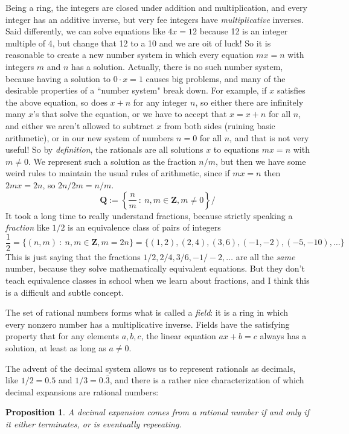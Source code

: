 \documentclass[11pt]{amsart}
\newcommand*{\Z}{\ensuremath{\mathbf{Z}}}
\newcommand*{\Q}{\ensuremath{\mathbf{Q}}}
\theoremstyle{plain}
\newtheorem{proposition}[theorem]{Proposition}
\theoremstyle{definition}
\theoremstyle{remark}
\numberwithin{theorem}{section}
\numberwithin{equation}{section}
\begin{document}
Being a ring, the integers are closed under addition and multiplication, and every integer has an additive inverse, but very fee integers
have {\em multiplicative} inverses.  Said differently, we can solve equations like $4x = 12$ because 12 is an integer multiple of 4, 
but change that 12 to a 10 and we are oit of luck!  So it is reasonable to create a new number system in which every equation $mx=n$
with integers $m$ and $n$ has a solution.  Actually, there is no such number system, because having a solution to $0\cdot x = 1$
causes big problems, and many of the desirable properties of a ``number system" break down.  For example, if $x$ satisfies the above equation,
so does $x+n$ for any integer $n$, so either there are infinitely many $x$'s that solve the equation, or we have to accept that $x=x+n$ for all $n$,
and either we aren't allowed to subtract $x$ from both sides (ruining basic arithmetic), or in our new system of numbers $n=0$ for all $n$,
and that is not very useful!  So by {\em definition}, the rationals are all solutions $x$ to equations $mx=n$ with $m\neq 0$.  We
represent such a solution as the fraction $n/m$, but then we have some weird rules to maintain the usual rules of arithmetic,
since if $mx=n$ then $2mx = 2n$, so $2n/2m = n/m$.  
$$
	\Q:=\left\{\frac{n}{m}\ :\ n,m\in \Z, m\neq 0\right\}/
$$
It took a long time to really understand fractions, because strictly speaking a {\em fraction} like $1/2$ is an equivalence class of pairs of integers
$$
	\frac{1}{2} = \{ (n,m)\ :\ n,m\in \Z, m=2n \} = \{ (1,2), (2,4), (3,6), (-1,-2), (-5,-10),\ldots\}
$$
This is just saying that the fractions ${1/2}, 2/4, 3/6, -1/-2,\ldots$ are all the {\em same} number, because they solve mathematically equivalent
equations.  But they don't teach equivalence classes in school when we learn about fractions, and I think this is a difficult and subtle concept.

The set of rational numbers forms what is called a {\em field}: it is a ring in which every nonzero number has a multiplicative inverse.
Fields have the satisfying property that for any elements $a,b,c$, the linear equation $ax+b=c$ always has a solution, at least as long
as $a\neq 0$.

The advent of the decimal system allows us to represent rationals as decimals, like $1/2 = 0.5$ and $1/3 = 0.\overline{3}$,
and there is a rather nice characterization of which decimal expansions are rational numbers: 

\begin{proposition}\label{rat}
	A decimal expansion comes from a rational number if and only if it either terminates, or is eventually repeeating.
\end{proposition}
\end{document}
